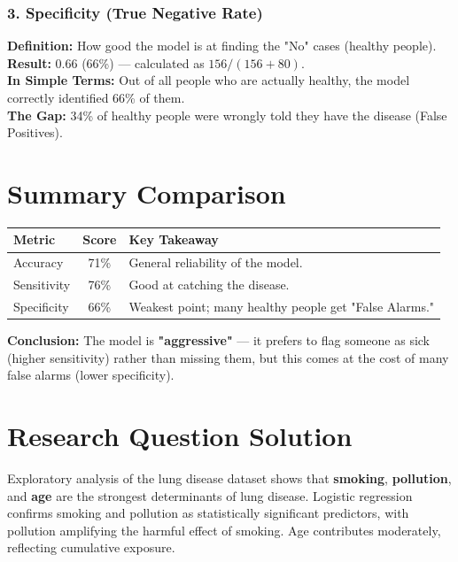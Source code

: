 \documentclass[a4paper,12pt]{article}
\begin{document}

\subsubsection{3. Specificity (True Negative Rate)}
\textbf{Definition:} How good the model is at finding the "No" cases (healthy people).  \\
\textbf{Result:} 0.66 (66\%) — calculated as \(156 / (156 + 80)\). \\ 
\textbf{In Simple Terms:} Out of all people who are actually healthy, the model correctly identified 66\% of them.  \\
\textbf{The Gap:} 34\% of healthy people were wrongly told they have the disease (False Positives).

\section{Summary Comparison}

\begin{center}
	\begin{tabular}{|l|c|l|}
		\hline
		\textbf{Metric} & \textbf{Score} & \textbf{Key Takeaway} \\
		\hline
		Accuracy & 71\% & General reliability of the model. \\
		\hline
		Sensitivity & 76\% & Good at catching the disease. \\
		\hline
		Specificity & 66\% & Weakest point; many healthy people get "False Alarms." \\
		\hline
	\end{tabular}
\end{center}

\vspace{1em}

\textbf{Conclusion:} The model is \textbf{"aggressive"} — it prefers to flag someone as sick (higher sensitivity) rather than missing them, but this comes at the cost of many false alarms (lower specificity).


\section{Research Question Solution}

Exploratory analysis of the lung disease dataset shows that \textbf{smoking}, \textbf{pollution}, and \textbf{age} are the strongest determinants of lung disease. Logistic regression confirms smoking and pollution as statistically significant predictors, with pollution amplifying the harmful effect of smoking. Age contributes moderately, reflecting cumulative exposure.
\end{document}
